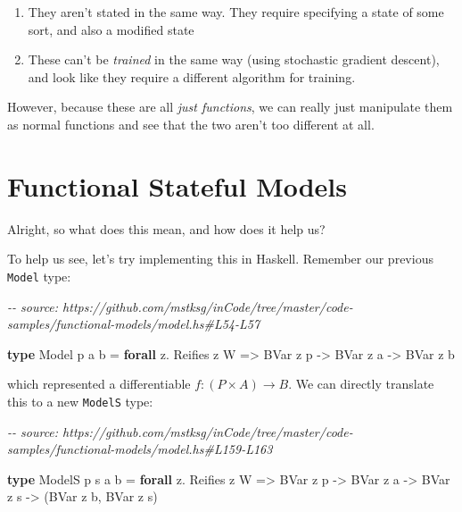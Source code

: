 \documentclass[]{article}
\newenvironment{Shaded}{}{}
\newcommand{\CommentTok}[1]{\textcolor[rgb]{0.38,0.63,0.69}{\textit{#1}}}
\newcommand{\DataTypeTok}[1]{\textcolor[rgb]{0.56,0.13,0.00}{#1}}
\newcommand{\KeywordTok}[1]{\textcolor[rgb]{0.00,0.44,0.13}{\textbf{#1}}}
\newcommand{\NormalTok}[1]{#1}
\newcommand{\OperatorTok}[1]{\textcolor[rgb]{0.40,0.40,0.40}{#1}}
\newcommand{\OtherTok}[1]{\textcolor[rgb]{0.00,0.44,0.13}{#1}}
\begin{document}
\begin{enumerate}
\def\labelenumi{\arabic{enumi}.}
\tightlist
\item
  They aren't stated in the same way. They require specifying a state of some
  sort, and also a modified state
\item
  These can't be \emph{trained} in the same way (using stochastic gradient
  descent), and look like they require a different algorithm for training.
\end{enumerate}

However, because these are all \emph{just functions}, we can really just
manipulate them as normal functions and see that the two aren't too different at
all.

\section{Functional Stateful Models}\label{functional-stateful-models}

Alright, so what does this mean, and how does it help us?

To help us see, let's try implementing this in Haskell. Remember our previous
\texttt{Model} type:

\begin{Shaded}
\begin{Highlighting}[]
\CommentTok{{-}{-} source: https://github.com/mstksg/inCode/tree/master/code{-}samples/functional{-}models/model.hs\#L54{-}L57}

\KeywordTok{type} \DataTypeTok{Model}\NormalTok{ p a b }\OtherTok{=} \KeywordTok{forall}\NormalTok{ z}\OperatorTok{.} \DataTypeTok{Reifies}\NormalTok{ z }\DataTypeTok{W}
                \OtherTok{=\textgreater{}} \DataTypeTok{BVar}\NormalTok{ z p}
                \OtherTok{{-}\textgreater{}} \DataTypeTok{BVar}\NormalTok{ z a}
                \OtherTok{{-}\textgreater{}} \DataTypeTok{BVar}\NormalTok{ z b}
\end{Highlighting}
\end{Shaded}

which represented a differentiable \(f : (P \times A) \rightarrow B\). We can
directly translate this to a new \texttt{ModelS} type:

\begin{Shaded}
\begin{Highlighting}[]
\CommentTok{{-}{-} source: https://github.com/mstksg/inCode/tree/master/code{-}samples/functional{-}models/model.hs\#L159{-}L163}

\KeywordTok{type} \DataTypeTok{ModelS}\NormalTok{ p s a b }\OtherTok{=} \KeywordTok{forall}\NormalTok{ z}\OperatorTok{.} \DataTypeTok{Reifies}\NormalTok{ z }\DataTypeTok{W}
                   \OtherTok{=\textgreater{}} \DataTypeTok{BVar}\NormalTok{ z p}
                   \OtherTok{{-}\textgreater{}} \DataTypeTok{BVar}\NormalTok{ z a}
                   \OtherTok{{-}\textgreater{}} \DataTypeTok{BVar}\NormalTok{ z s}
                   \OtherTok{{-}\textgreater{}}\NormalTok{ (}\DataTypeTok{BVar}\NormalTok{ z b, }\DataTypeTok{BVar}\NormalTok{ z s)}
\end{Highlighting}
\end{Shaded}
\end{document}
